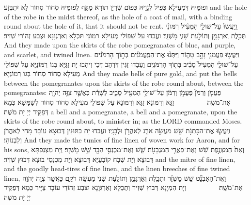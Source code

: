 {{וּפוּמֵּיהּ דִּמְעִילָא כְּפִיל לְגַוֵּיהּ כְּפוֹם שִׁרְיָן תּוּרָא מַקַּף לְפוּמֵּיהּ סְחוֹר סְחוֹר לָא יִתְבְּזַע׃}
{and the hole of the robe in the midst thereof, as the hole of a coat of mail, with a binding round about the hole of it, that it should not be rent.}{}
{וַֽיַּעֲשׂוּ֙ עַל־שׁוּלֵ֣י הַמְּעִ֔יל רִמּוֹנֵ֕י תְּכֵ֥לֶת וְאַרְגָּמָ֖ן וְתוֹלַ֣עַת שָׁנִ֑י מׇשְׁזָֽר׃}
{וַעֲבַדוּ עַל שִׁפּוֹלֵי מְעִילָא רִמּוֹנֵי תַּכְלָא וְאַרְגְּוָנָא וּצְבַע זְהוֹרִי שְׁזִיר׃}
{And they made upon the skirts of the robe pomegranates of blue, and purple, and scarlet, and twined linen.}{}
{וַיַּעֲשׂ֥וּ פַעֲמֹנֵ֖י זָהָ֣ב טָה֑וֹר וַיִּתְּנ֨וּ אֶת־הַפַּֽעֲמֹנִ֜ים בְּת֣וֹךְ הָרִמֹּנִ֗ים עַל־שׁוּלֵ֤י הַמְּעִיל֙ סָבִ֔יב בְּת֖וֹךְ הָרִמֹּנִֽים׃}
{וַעֲבַדוּ זַגִּין דִּדְהַב דְּכֵי וִיהַבוּ יָת זַגַּיָּא בְּגוֹ רִמּוֹנַיָּא עַל שִׁפּוֹלֵי מְעִילָא סְחוֹר סְחוֹר בְּגוֹ רִמּוֹנַיָּא׃}
{And they made bells of pure gold, and put the bells between the pomegranates upon the skirts of the robe round about, between the pomegranates:}{}
{פַּעֲמֹ֤ן וְרִמֹּן֙ פַּעֲמֹ֣ן וְרִמֹּ֔ן עַל־שׁוּלֵ֥י הַמְּעִ֖יל סָבִ֑יב לְשָׁרֵ֕ת כַּאֲשֶׁ֛ר צִוָּ֥ה יְהֹוָ֖ה אֶת־מֹשֶֽׁה׃ \setuma         }
{זַגָּא וְרִמּוֹנָא זַגָּא וְרִמּוֹנָא עַל שִׁפּוֹלֵי מְעִילָא סְחוֹר סְחוֹר לְשַׁמָּשָׁא כְּמָא דְּפַקֵּיד יְיָ יָת מֹשֶׁה׃}
{a bell and a pomegranate, a bell and a pomegranate, upon the skirts of the robe round about, to minister in; as the LORD commanded Moses.}{}
{וַֽיַּעֲשׂ֛וּ אֶת־הַכׇּתְנֹ֥ת שֵׁ֖שׁ מַעֲשֵׂ֣ה אֹרֵ֑ג לְאַהֲרֹ֖ן וּלְבָנָֽיו׃}
{וַעֲבַדוּ יָת כִּתּוּנִין דְּבוּצָא עוֹבָד מָחֵי לְאַהֲרֹן וְלִבְנוֹהִי׃}
{And they made the tunics of fine linen of woven work for Aaron, and for his sons,}{}
{וְאֵת֙ הַמִּצְנֶ֣פֶת שֵׁ֔שׁ וְאֶת־פַּאֲרֵ֥י הַמִּגְבָּעֹ֖ת שֵׁ֑שׁ וְאֶת־מִכְנְסֵ֥י הַבָּ֖ד שֵׁ֥שׁ מׇשְׁזָֽר׃
}
{וְיָת מַצְנַפְתָּא דְּבוּצָא וְיָת שְׁבָח קוֹבְעַיָּא דְּבוּצָא וְיָת מִכְנְסֵי בוּצָא דְּבוּץ שְׁזִיר׃}
{and the mitre of fine linen, and the goodly head-tires of fine linen, and the linen breeches of fine twined linen,}{}
{וְֽאֶת־הָאַבְנֵ֞ט שֵׁ֣שׁ מׇשְׁזָ֗ר וּתְכֵ֧לֶת וְאַרְגָּמָ֛ן וְתוֹלַ֥עַת שָׁנִ֖י מַעֲשֵׂ֣ה רֹקֵ֑ם כַּאֲשֶׁ֛ר צִוָּ֥ה יְהֹוָ֖ה אֶת־מֹשֶֽׁה׃ \setuma         }
{וְיָת הִמְיָנָא דְּבוּץ שְׁזִיר וְתַכְלָא וְאַרְגְּוָנָא וּצְבַע זְהוֹרִי עוֹבָד צַיָּיר כְּמָא דְּפַקֵּיד יְיָ יָת מֹשֶׁה׃}
}
